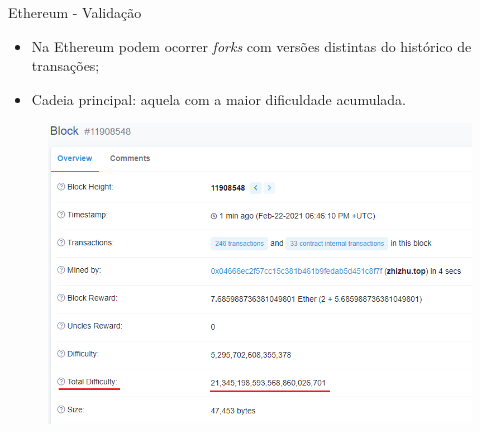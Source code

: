 \begin{frame}{Ethereum - Validação}
    \begin{itemize}
        \item Na Ethereum podem ocorrer \textit{forks} com versões distintas do histórico de transações;
        \item Cadeia principal: aquela com a maior dificuldade acumulada.
    \end{itemize}
    \begin{figure}[!htb]
     \centering
     \includegraphics[scale=0.35]{figuras/blockchain/block-eth-difficulty.png}
    \end{figure} 
\end{frame}

